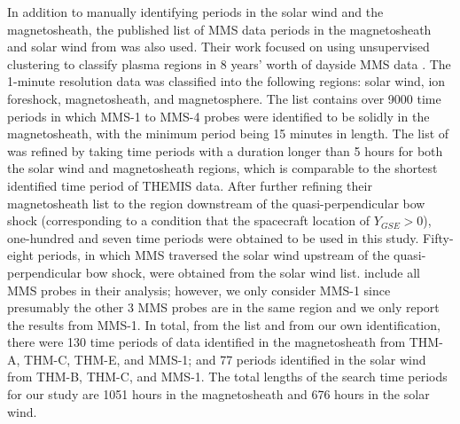 In addition to manually identifying periods in the solar wind and the magnetosheath, the published list of MMS data periods in the magnetosheath and solar wind from \cite{ToyEdens:2024} was also used. Their work focused on using unsupervised clustering to classify plasma regions in 8 years' worth of dayside MMS data \citep{ToyEdens2:2024}. The 1-minute resolution data was classified into the following regions: solar wind, ion foreshock, magnetosheath, and magnetosphere. The \cite{ToyEdens:2024} list contains over 9000 time periods in which MMS-1 to MMS-4 probes were identified to be solidly in the magnetosheath, with the minimum period being 15 minutes in length. The list of \cite{ToyEdens:2024} was refined by taking time periods with a duration longer than 5 hours for both the solar wind and magnetosheath regions, which is comparable to the shortest identified time period of THEMIS data. After further refining their magnetosheath list to the region downstream of the quasi-perpendicular bow shock (corresponding to a condition that the spacecraft location of $Y_{GSE}>0$), one-hundred and seven time periods were obtained to be used in this study. Fifty-eight periods, in which MMS traversed the solar wind upstream of the quasi-perpendicular bow shock, were obtained from the \cite{ToyEdens:2024} solar wind list. \cite{ToyEdens2:2024} include all MMS probes in their analysis; however, we only consider MMS-1 since presumably the other 3 MMS probes are in the same region and we only report the results from MMS-1. In total, from the \cite{ToyEdens:2024} list and from our own identification, there were 130 time periods of data identified in the magnetosheath from THM-A, THM-C, THM-E, and MMS-1; and 77 periods identified in the solar wind from THM-B, THM-C, and MMS-1. The total lengths of the search time periods for our study are 1051 hours in the magnetosheath and 676 hours in the solar wind. %

